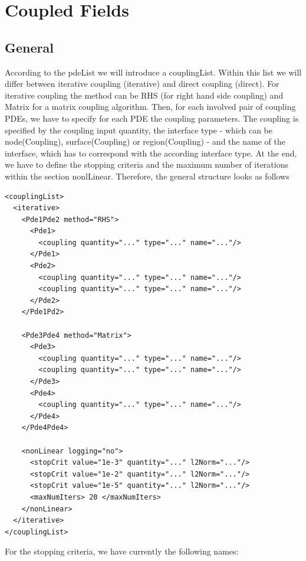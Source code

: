 \chapter{Coupled Fields}

\section{General}
According to the {\sf pdeList} we will introduce a {\sf couplingList}. Within this
list we will differ between iterative coupling ({\sf iterative}) and direct
coupling ({\sf direct}). For iterative coupling the method can be {\sf RHS} 
(for right hand side coupling) and {\sf Matrix} for a matrix coupling algorithm.
Then, for each involved pair of coupling PDEs, we have
to specify for each PDE the coupling parameters. 
The coupling is specified by the coupling input {\sf quantity}, the
interface {\sf type} - which can be {\sf node}(Coupling),
{\sf surface}(Coupling) or {\sf region}(Coupling) -  and the {\sf name} of
the interface, which has to correspond with the according interface
{\sf type}. At the end, we have to define
the stopping criteria and the maximum number of iterations
within the section {\sf nonlLinear}. Therefore, the general structure 
looks as follows


\begin{verbatim}
<couplingList>
  <iterative>
    <Pde1Pde2 method="RHS">
      <Pde1>
        <coupling quantity="..." type="..." name="..."/>
      </Pde1>
      <Pde2>
        <coupling quantity="..." type="..." name="..."/>
        <coupling quantity="..." type="..." name="..."/>
      </Pde2>
    </Pde1Pd2>

    <Pde3Pde4 method="Matrix">
      <Pde3>
        <coupling quantity="..." type="..." name="..."/>
        <coupling quantity="..." type="..." name="..."/>
      </Pde3>
      <Pde4>
        <coupling quantity="..." type="..." name="..."/>
      </Pde4>
    </Pde4Pde4>

    <nonLinear logging="no">
      <stopCrit value="1e-3" quantity="..." l2Norm="..."/>
      <stopCrit value="1e-2" quantity="..." l2Norm="..."/>
      <stopCrit value="1e-5" quantity="..." l2Norm="..."/>
      <maxNumIters> 20 </maxNumIters>
    </nonLinear>
  </iterative>
</couplingList>
\end{verbatim}

\noindent
For the stopping criteria, we have currently the following names:

